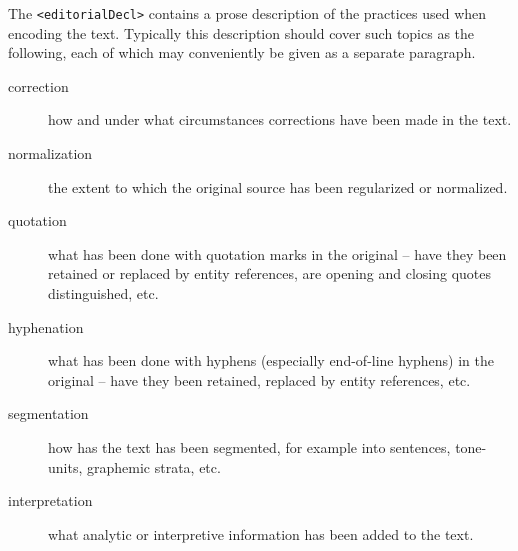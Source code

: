 \documentclass[11pt,twoside]{article}\makeatletter
\begin{document}
The \texttt{<editorialDecl>} contains a prose description of the practices used when encoding the text. Typically this description should cover such topics as the following, each of which may conveniently be given as a separate paragraph.  \begin{description}

\item[correction ]how and under what circumstances corrections have been made in the text.
\item[normalization]the extent to which the original source has been regularized or normalized.
\item[quotation]what has been done with quotation marks in the original -- have they been retained or replaced by entity references, are opening and closing quotes distinguished, etc. 
\item[hyphenation]what has been done with hyphens (especially end-of-line hyphens)  in the original -- have they been retained, replaced by entity references, etc.
\item[segmentation]how has the text has been segmented, for example into sentences, tone-units, graphemic strata, etc.
\item[interpretation]what analytic or interpretive information has been added to the text. 
\end{description} \par
\end{document}
